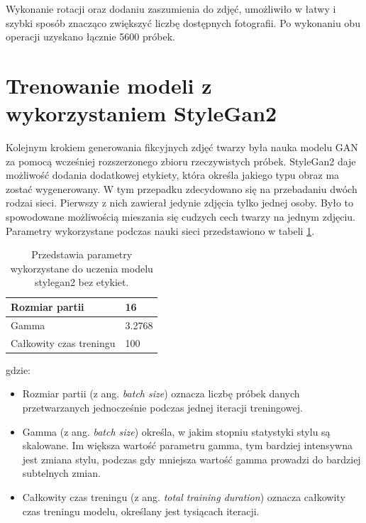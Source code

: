 \documentclass[eng,printmode]{mgr}
\begin{document}
Wykonanie rotacji oraz dodaniu zaszumienia do zdjęć, umożliwiło w łatwy i szybki sposób znacząco zwiększyć liczbę dostępnych fotografii. Po wykonaniu obu operacji uzyskano łącznie 5600 próbek.  





\section{Trenowanie modeli z wykorzystaniem StyleGan2}

Kolejnym krokiem generowania fikcyjnych zdjęć twarzy była nauka modelu GAN za pomocą wcześniej rozszerzonego zbioru rzeczywistych próbek. StyleGan2 daje możliwość dodania dodatkowej etykiety, która określa jakiego typu obraz ma zostać wygenerowany. W tym przepadku zdecydowano się na przebadaniu dwóch rodzai sieci. Pierwszy z nich zawierał jedynie zdjęcia tylko jednej osoby. Było to spowodowane możliwością mieszania się cudzych cech twarzy na jednym zdjęciu. Parametry wykorzystane podczas nauki sieci przedstawiono w tabeli \ref{tab:parametry_1}.

\begin{table}[H]
\centering
\small
\begin{tabular}{|l|l|}
\hline
Rozmiar partii          & 16     \\ \hline
Gamma                   & 3.2768 \\ \hline
Całkowity czas treningu & 100   \\ \hline
\end{tabular}
\caption{Przedstawia parametry wykorzystane do uczenia modelu stylegan2 bez etykiet.}
 \label{tab:parametry_1} 
\end{table}

gdzie:   

\begin{itemize}

\item Rozmiar partii (z ang. \textit{batch size}) oznacza liczbę próbek danych przetwarzanych jednocześnie podczas jednej iteracji treningowej.

\item Gamma (z ang. \textit{batch size}) określa, w jakim stopniu statystyki stylu są skalowane. Im większa wartość parametru gamma, tym bardziej intensywna jest zmiana stylu, podczas gdy mniejsza wartość gamma prowadzi do bardziej subtelnych zmian.

\item Całkowity czas treningu (z ang. \textit{total training duration}) oznacza całkowity czas treningu modelu, określany jest tysiącach iteracji. 

\end{itemize}
\end{document}
